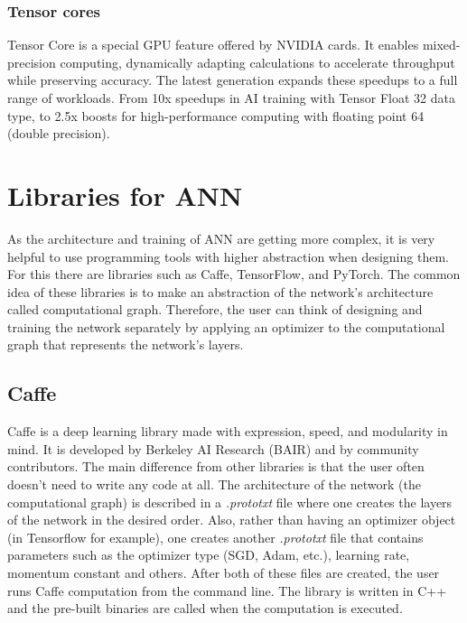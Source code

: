 \subsubsection{Tensor cores}

Tensor Core is a special GPU feature offered by NVIDIA cards. It enables mixed-precision computing, dynamically adapting calculations to accelerate throughput while preserving accuracy. The latest generation expands these speedups to a full range of workloads. From 10x speedups in AI training with Tensor Float 32 data type, to 2.5x boosts for high-performance computing with floating point 64 (double precision). \cite{nvidia}

\newpage
\section{Libraries for ANN}

As the architecture and training of ANN are getting more complex, it is very helpful to use programming tools with higher abstraction when designing them. For this there are libraries such as Caffe, TensorFlow, and PyTorch. The common idea of these libraries is to make an abstraction of the network's architecture called computational graph. Therefore, the user can think of designing and training the network separately by applying an optimizer to the computational graph that represents the network's layers. 

\subsection{Caffe}

Caffe is a deep learning library made with expression, speed, and modularity in mind. It is developed by Berkeley AI Research (BAIR) and by community contributors. \cite{caffe} The main difference from other libraries is that the user often doesn't need to write any code at all. The architecture of the network (the computational graph) is described in a \textit{.prototxt} file where one creates the layers of the network in the desired order. Also, rather than having an optimizer object (in Tensorflow for example), one creates another \textit{.prototxt} file that contains parameters such as the optimizer type (SGD, Adam, etc.), learning rate, momentum constant and others. After both of these files are created, the user runs Caffe computation from the command line. The library is written in C++ and the pre-built binaries are called when the computation is executed.

